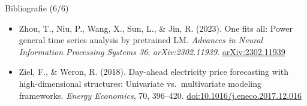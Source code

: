 \begin{frame}{Bibliografie (6/6)}
\begin{itemize}
    \item Zhou, T., Niu, P., Wang, X., Sun, L., \& Jin, R. (2023). One fits all: Power general time series analysis by pretrained LM. \textit{Advances in Neural Information Processing Systems 36}; \textit{arXiv:2302.11939}. \href{https://arxiv.org/abs/2302.11939}{arXiv:2302.11939}
    \item Ziel, F., \& Weron, R. (2018). Day-ahead electricity price forecasting with high-dimensional structures: Univariate vs.\ multivariate modeling frameworks. \textit{Energy Economics}, 70, 396--420. \href{https://doi.org/10.1016/j.eneco.2017.12.016}{doi:10.1016/j.eneco.2017.12.016}
\end{itemize}
\end{frame}


